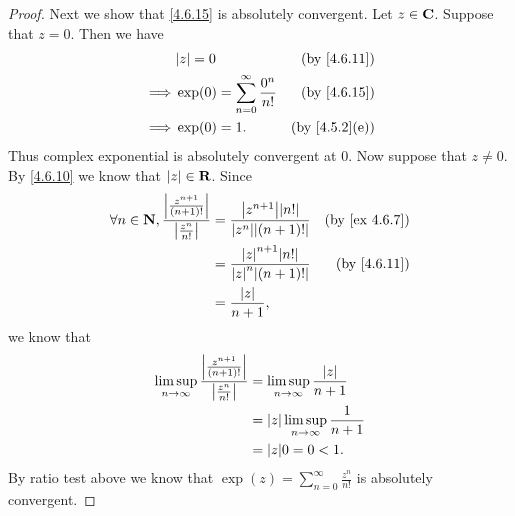 \begin{proof}
  Next we show that \cref{4.6.15} is absolutely convergent.
  Let \(z \in \mathbf{C}\).
  Suppose that \(z = 0\).
  Then we have
  \begin{align*}
             & \abs{z} = 0                                  & \text{(by \cref{4.6.11})}   \\
    \implies & \exp(0) = \sum_{n = 0}^\infty \frac{0^n}{n!} & \text{(by \cref{4.6.15})}   \\
    \implies & \exp(0) = 1.                                 & \text{(by \cref{4.5.2}(e))}
  \end{align*}
  Thus complex exponential is absolutely convergent at \(0\).
  Now suppose that \(z \neq 0\).
  By \cref{4.6.10} we know that \(\left\lvert z\right\rvert \in \mathbf{R}\).
  Since
  \begin{align*}
    \forall n \in \N, \frac{\abs{\frac{z^{n + 1}}{(n + 1)!}}}{\abs{\frac{z^n}{n!}}} & = \frac{\abs{z^{n + 1}} \abs{n!}}{\abs{z^n} \abs{(n + 1)!}} & \text{(by \cref{ex 4.6.7})} \\
                                                                                    & = \frac{\abs{z}^{n + 1} \abs{n!}}{\abs{z}^n \abs{(n + 1)!}} & \text{(by \cref{4.6.11})}   \\
                                                                                    & = \frac{\abs{z}}{n + 1},
  \end{align*}
  we know that
  \begin{align*}
    \limsup_{n \to \infty} \frac{\abs{\frac{z^{n + 1}}{(n + 1)!}}}{\abs{\frac{z^n}{n!}}} & = \limsup_{n \to \infty} \frac{\abs{z}}{n + 1}   \\
                                                                                         & = \abs{z} \limsup_{n \to \infty} \frac{1}{n + 1} \\
                                                                                         & = \abs{z} 0 = 0 < 1.
  \end{align*}
  By ratio test above we know that \(\exp(z) = \sum_{n = 0}^\infty \frac{z^n}{n!}\) is absolutely convergent.


\end{proof}
